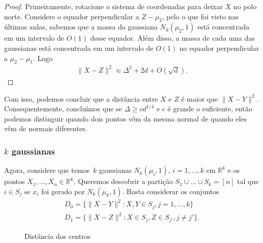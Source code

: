 \begin{proof}

  Primeiramente, rotacione o sistema de coordenadas para deixar $X$ no
  polo norte. Considere o equador perpendicular a $Z-\mu_{2}$, pelo o
  que foi visto nas últimas aulas, sabemos que a massa da gaussiana
  $N_{d}(\mu_{2},1)$ está concentrada em um intervalo de $O(1)$ desse
  equador. Além disso, a massa de cada uma das gaussianas está
  concentrada em um intervalo de $O(1)$ no equador perpendicular a
  $\mu_{2}-\mu_{1}$. Logo
  \begin{align*}
    \lVert X - Z \rVert^{2} \approx \Delta^{2}+2d+O(\sqrt{d}).
  \end{align*}
\end{proof}

Com isso, podemos concluir que a distância entre $X$ e $Z$ é maior que
$\lVert X - Y \rVert^{2}$. Consequentemente, concluímos que se
$\Delta \geq cd^{1/4}$ e $c$ é grande o suficiente, então podemos
distinguir quando dois pontos vêm da mesma normal de quando eles vêm
de normais diferentes.

\subsubsection{$k$ gaussianas}

Agora, considere que temos~$k$ gaussianas $N_{k}(\mu_{i},1)$,
$i=1,\dots,k$ em $\mathbb{R}^{k}$ e os pontos
$X_{1},\dots,X_{n} \in \mathbb{R}^{k}$. Queremos descobrir a partição
$S_{1} \cup \dots \cup S_{k} = [n]$ tal que $i \in S_{j}$ se $x_{i}$
foi gerado por $N_{k}(\mu_{k}, 1)$. Basta considerar os conjuntos
\begin{align*}
  D_{0} = \{ \lVert X - Y \rVert^{2} : X,Y \in S_{j}, j=1,\dots,k\}\\
  D_{1} = \{ \lVert X - Z \rVert^{2} : X \in S_{j}, Z \in S_{j'}, j \neq j'\}.
\end{align*}


\begin{figure}
  \caption{Distância dos centros}
  \label{fig:dist_centros}
\end{figure}

